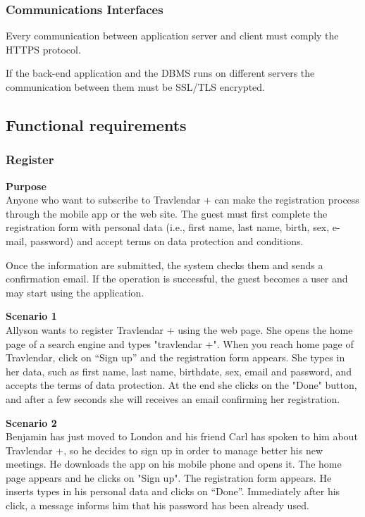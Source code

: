 \documentclass{article}
\begin{document}
	
	\subsubsection{Communications Interfaces}
	Every communication between application server and client must comply the HTTPS protocol.
	
	\bigskip
	If the back-end application and the DBMS runs on different servers the communication between them must be SSL/TLS encrypted.
	
	
	\subsection{Functional requirements}
	
	
	\subsubsection{Register}
	
	\bigskip
	\noindent
	\textbf{Purpose} \\
	Anyone who want to subscribe to Travlendar + can make the registration process through the mobile app or the web site.
	The guest must first complete the registration form with personal data (i.e., first name, last name, birth, sex, e-mail, password) and accept terms on data protection and conditions.
	
	Once the information are submitted, the system checks them and sends a confirmation email. If the operation is successful, the guest becomes a user and may start using the application.

	\bigskip
	\noindent
	\textbf{Scenario 1} \\
	Allyson wants to register Travlendar + using the web page. She opens the home page of a search engine and types "travlendar +". When you reach home page of Travlendar, click on “Sign up” and the registration form appears. She types in her data, such as first name, last name, birthdate, sex, email and password, and accepts the terms of data protection. At the end she clicks on the "Done" button, and after a few seconds she will receives an email confirming her registration.

	\bigskip
	\noindent
	\textbf{Scenario 2} \\
	Benjamin has just moved to London and his friend Carl has spoken to him about  Travlendar +, so he decides to sign up in order to manage better his new meetings. He downloads the app on his mobile phone and opens it. The home page appears and he clicks on "Sign up". The registration form appears. He inserts types in his personal data and clicks on “Done”. Immediately after his click, a message informs him that his password has been already used.
	
\end{document}
